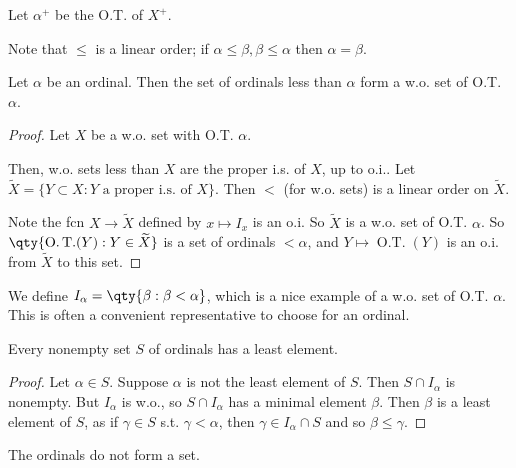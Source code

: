 \begin{notation}
    Let $\alpha^+$ be the O.T. of $X^+$.
\end{notation}

\begin{remark}
    Note that $\leq$ is a linear order; if $\alpha \leq \beta, \beta \leq \alpha$ then $\alpha = \beta$.
\end{remark}

\begin{theorem} \label{thm:9}
    Let $\alpha$ be an ordinal.
    Then the set of ordinals less than $\alpha$ form a w.o. set of O.T. $\alpha$.
\end{theorem}

\begin{proof}
    Let $X$ be a w.o. set with O.T. $\alpha$.

    Then, w.o. sets less than $X$ are the proper i.s. of $X$, up to o.i..
    Let $\widetilde{X} = \{Y \subset X : Y \text{ a proper i.s. of } X\}$.
    Then $<$ (for w.o. sets) is a linear order on $\widetilde{X}$.

    Note the fcn $X \to \widetilde{X}$ defined by $x \mapsto I_x$ is an o.i.
    So $\widetilde{X}$ is a w.o. set of O.T. $\alpha$.
    So $\qty{\operatorname{O.T.}(Y) : Y \in \widetilde{X}}$ is a set of ordinals $< \alpha$, and $Y \mapsto \operatorname{O.T.}(Y)$ is an o.i. from $\widetilde{X}$ to this set.
\end{proof}

\begin{notation}
    We define $I_\alpha = \qty{\beta : \beta < \alpha}$, which is a nice example of a w.o. set of O.T. $\alpha$.
    This is often a convenient representative to choose for an ordinal.
\end{notation}

\begin{proposition} \label{prp:10}
    Every nonempty set $S$ of ordinals has a least element.
\end{proposition}

\begin{proof}
    Let $\alpha \in S$.
    Suppose $\alpha$ is not the least element of $S$.
    Then $S \cap I_\alpha$ is nonempty.
    But $I_\alpha$ is w.o., so $S \cap I_\alpha$ has a minimal element $\beta$.
    Then $\beta$ is a least element of $S$, as if $\gamma \in S$ s.t. $\gamma < \alpha$, then $\gamma \in I_\alpha \cap S$ and so $\beta \leq \gamma$.
\end{proof}

\begin{theorem}
    The ordinals do not form a set.
\end{theorem}

